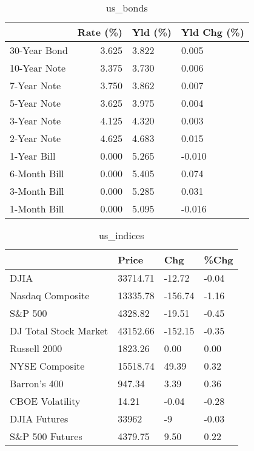 \documentclass{article}%
\begin{document}
\begin{table}[htbp]%
\caption{us\_bonds}%
\centering%
\begin{adjustbox}{width=1\textwidth}%
\begin{tabular}{lrll}
\toprule
             &  Rate (\%) & Yld (\%) & Yld Chg (\%) \\
\midrule
30-Year Bond &     3.625 &   3.822 &       0.005 \\
10-Year Note &     3.375 &   3.730 &       0.006 \\
 7-Year Note &     3.750 &   3.862 &       0.007 \\
 5-Year Note &     3.625 &   3.975 &       0.004 \\
 3-Year Note &     4.125 &   4.320 &       0.003 \\
 2-Year Note &     4.625 &   4.683 &       0.015 \\
 1-Year Bill &     0.000 &   5.265 &      -0.010 \\
6-Month Bill &     0.000 &   5.405 &       0.074 \\
3-Month Bill &     0.000 &   5.285 &       0.031 \\
1-Month Bill &     0.000 &   5.095 &      -0.016 \\
\bottomrule
\end{tabular}
%
\end{adjustbox}%
\end{table}

%


\begin{table}[htbp]%
\caption{us\_indices}%
\centering%
\begin{adjustbox}{width=1\textwidth}%
\begin{tabular}{llll}
\toprule
                      &    Price &     Chg &  \%Chg \\
\midrule
                 DJIA & 33714.71 &  -12.72 & -0.04 \\
     Nasdaq Composite & 13335.78 & -156.74 & -1.16 \\
              S\&P 500 &  4328.82 &  -19.51 & -0.45 \\
DJ Total Stock Market & 43152.66 & -152.15 & -0.35 \\
         Russell 2000 &  1823.26 &    0.00 &  0.00 \\
       NYSE Composite & 15518.74 &   49.39 &  0.32 \\
         Barron's 400 &   947.34 &    3.39 &  0.36 \\
      CBOE Volatility &    14.21 &   -0.04 & -0.28 \\
         DJIA Futures &    33962 &      -9 & -0.03 \\
      S\&P 500 Futures &  4379.75 &    9.50 &  0.22 \\
\bottomrule
\end{tabular}
%
\end{adjustbox}%
\end{table}
\end{document}
